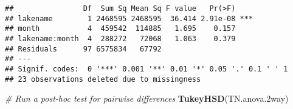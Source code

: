 \documentclass[
]{article}
\newenvironment{Shaded}{\begin{snugshade}}{\end{snugshade}}
\newcommand{\CommentTok}[1]{\textcolor[rgb]{0.56,0.35,0.01}{\textit{#1}}}
\newcommand{\FloatTok}[1]{\textcolor[rgb]{0.00,0.00,0.81}{#1}}
\newcommand{\KeywordTok}[1]{\textcolor[rgb]{0.13,0.29,0.53}{\textbf{#1}}}
\newcommand{\NormalTok}[1]{#1}
\begin{document}
\begin{verbatim}
##                Df  Sum Sq Mean Sq F value   Pr(>F)    
## lakename        1 2468595 2468595  36.414 2.91e-08 ***
## month           4  459542  114885   1.695    0.157    
## lakename:month  4  288272   72068   1.063    0.379    
## Residuals      97 6575834   67792                     
## ---
## Signif. codes:  0 '***' 0.001 '**' 0.01 '*' 0.05 '.' 0.1 ' ' 1
## 23 observations deleted due to missingness
\end{verbatim}

\begin{Shaded}
\begin{Highlighting}[]
\CommentTok{# Run a post-hoc test for pairwise differences}
\KeywordTok{TukeyHSD}\NormalTok{(TN.anova}\FloatTok{.2}\NormalTok{way)}
\end{Highlighting}
\end{Shaded}
\end{document}
